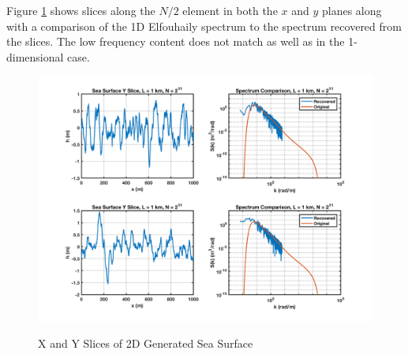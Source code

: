 Figure \ref{os_fig:10} shows slices along the $N/2$ element in both the $x$ and $y$ planes along with a comparison of the 1D Elfouhaily spectrum to the spectrum recovered from the slices. The low frequency content does not match as well as in the 1-dimensional case.
\begin{figure}[H]
  \begin{center}
\includegraphics[width=6in]{../media/Ocean_Surface/sea_surface_2d_slices1000.png}
  \end{center}
  \renewcommand{\baselinestretch}{1} \small\normalsize
  \begin{quote}
    \caption[X and Y Slices of 2D Generated Sea Surface]{X and Y Slices of 2D Generated Sea Surface\label{os_fig:10}}
  \end{quote}
\end{figure}
\renewcommand{\baselinestretch}{2} \small\normalsize